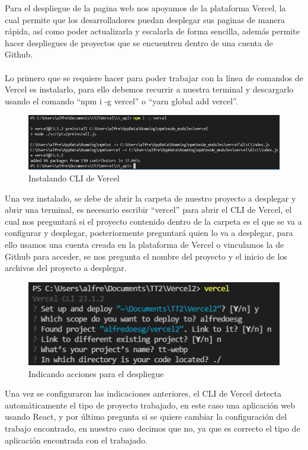 \documentclass[12pt, a4paper, titlepage]{article}
\begin{document}
	Para el despliegue de la pagina web nos apoyamos de la plataforma Vercel, la cual permite que los desarrolladores puedan desplegar sus paginas de manera rápida, así como poder actualizarla y escalarla de forma sencilla, además permite hacer despliegues de proyectos que se encuentren dentro de una cuenta de Github.\\\\
	Lo primero que se requiere hacer para poder trabajar con la línea de comandos de Vercel es instalarlo, para ello debemos recurrir a nuestra terminal y descargarlo usando el comando “npm i -g vercel” o “yarn global add vercel”.
	\begin{figure}[H]
		\includegraphics[width=12cm]{./Imagenes/Despliegue/Instalacion.png}
		\centering 
		\caption{Instalando CLI de Vercel}
	\end{figure}
	Una vez instalado, se debe de abrir la carpeta de nuestro proyecto a desplegar y abrir una terminal, es necesario escribir “vercel” para abrir el CLI de Vercel, el cual nos preguntará si el proyecto contenido dentro de la carpeta es el que se va a configurar y desplegar, posteriormente preguntará quien lo va a desplegar, para ello usamos una cuenta creada en la plataforma de Vercel o vinculamos la de Github para acceder, se nos pregunta el nombre del proyecto y el inicio de los archivos del proyecto a desplegar.
	\begin{figure}[H]
		\includegraphics[width=12cm]{./Imagenes/Despliegue/Acciones.png}
		\centering 
		\caption{Indicando acciones para el despliegue}
	\end{figure}
	Una vez se configuraron las indicaciones anteriores, el CLI de Vercel detecta automáticamente el tipo de proyecto trabajado, en este caso una aplicación web usando React, y por último pregunta si se quiere cambiar la configuración del trabajo encontrado, en nuestro caso decimos que no, ya que es correcto el tipo de aplicación encontrada con el trabajado.
\end{document}
